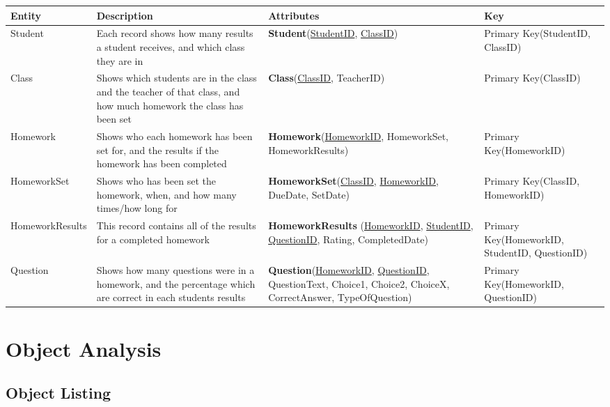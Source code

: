 \begin{center}
\begin{tabular}{|p{3cm}|p{4cm}|p{4cm}|p{3cm}|} \hline
\textbf{Entity} & \textbf{Description} & \textbf{Attributes} & \textbf{Key} \\ \hline
Student & Each record shows how many results a student receives, and which class they are in & \textbf{Student}(\underline{StudentID}, \underline{ClassID}) & Primary Key(StudentID, ClassID) \\ \hline
Class & Shows which students are in the class and the teacher of that class, and how much homework the class has been set & \textbf{Class}(\underline{ClassID}, TeacherID) & Primary Key(ClassID) \\ \hline
Homework & Shows who each homework has been set for, and the results if the homework has been completed & \textbf{Homework}(\underline{HomeworkID}, HomeworkSet, HomeworkResults) & Primary Key(HomeworkID) \\ \hline 
HomeworkSet & Shows who has been set the homework, when, and how many times/how long for & \textbf{HomeworkSet}(\underline{ClassID}, \underline{HomeworkID}, DueDate, SetDate) & Primary Key(ClassID, HomeworkID) \\ \hline
HomeworkResults & This record contains all of the results for a completed homework & \textbf{HomeworkResults} (\underline{HomeworkID}, \underline{StudentID}, \underline{QuestionID}, Rating, CompletedDate) & Primary Key(HomeworkID, StudentID, QuestionID) \\ \hline
Question & Shows how many questions were in a homework, and the percentage which are correct in each students results & \textbf{Question}(\underline{HomeworkID}, \underline{QuestionID}, QuestionText, Choice1, Choice2, ChoiceX, CorrectAnswer, TypeOfQuestion) & Primary Key(HomeworkID, QuestionID) \\ \hline
\end{tabular}
\end{center}

\section{Object Analysis}

\subsection{Object Listing}

